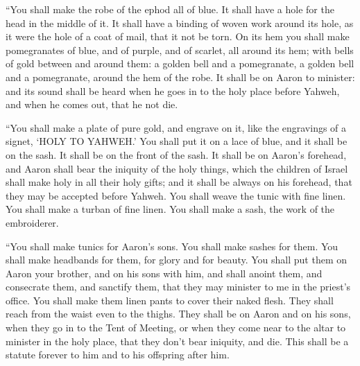 {\par }{\PP {}“You shall make the robe of the ephod all of blue.
It shall have a hole for the head in the middle of it. It shall have a binding of woven work around its hole, as it were the hole of a coat of mail, that it not be torn.
On its hem you shall make pomegranates of blue, and of purple, and of scarlet, all around its hem; with bells of gold between and around them:
a golden bell and a pomegranate, a golden bell and a pomegranate, around the hem of the robe.
It shall be on Aaron to minister: and its sound shall be heard when he goes in to the holy place before Yahweh, and when he comes out, that he not die.
\par }{\PP {}“You shall make a plate of pure gold, and engrave on it, like the engravings of a signet, ‘HOLY TO YAHWEH.’
You shall put it on a lace of blue, and it shall be on the sash. It shall be on the front of the sash.
It shall be on Aaron’s forehead, and Aaron shall bear the iniquity of the holy things, which the children of Israel shall make holy in all their holy gifts; and it shall be always on his forehead, that they may be accepted before Yahweh.
You shall weave the tunic with fine linen. You shall make a turban of fine linen. You shall make a sash, the work of the embroiderer.
\par }{\PP {}“You shall make tunics for Aaron’s sons. You shall make sashes for them. You shall make headbands for them, for glory and for beauty.
You shall put them on Aaron your brother, and on his sons with him, and shall anoint them, and consecrate them, and sanctify them, that they may minister to me in the priest’s office.
You shall make them linen pants to cover their naked flesh. They shall reach from the waist even to the thighs.
They shall be on Aaron and on his sons, when they go in to the Tent of Meeting, or when they come near to the altar to minister in the holy place, that they don’t bear iniquity, and die. This shall be a statute forever to him and to his offspring after him.

}
